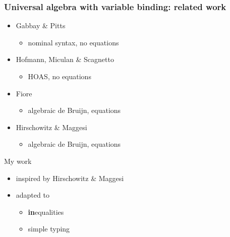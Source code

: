 \documentclass[
serif,
mathsans,
]
{beamer}
\begin{document}
\begin{frame}
 \frametitle{Universal algebra with variable binding: related work}
    \begin{itemize}
     \item Gabbay \& Pitts 
        \begin{itemize}
           \item nominal syntax, no equations
        \end{itemize}
     \item Hofmann, Miculan \& Scagnetto 
          \begin{itemize}
             \item HOAS, no equations
          \end{itemize}
     \item Fiore 
        \begin{itemize}
           \item algebraic de Bruijn, equations
        \end{itemize}
     \item Hirschowitz \& Maggesi
        \begin{itemize}
           \item algebraic de Bruijn, equations
        \end{itemize}
    \end{itemize}
  
  \begin{block}{My work}
    \begin{itemize}
     \item inspired by Hirschowitz \& Maggesi
     \item adapted to 
      \begin{itemize}
        \item \textbf{in}equalities
        \item simple typing
      \end{itemize}
    \end{itemize}

  \end{block}

  
\end{frame}
\end{document}
